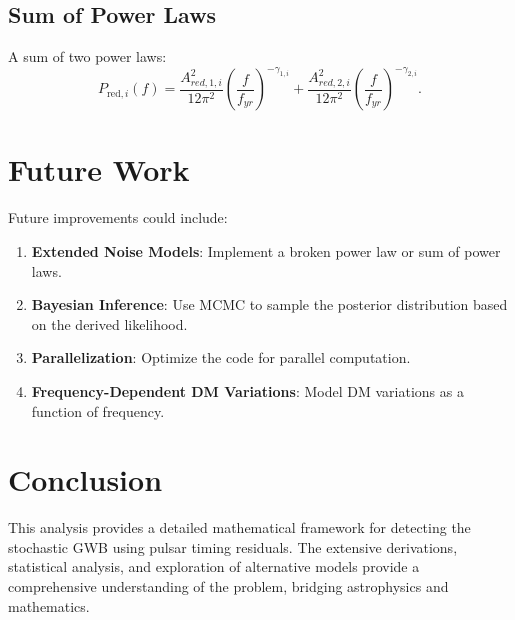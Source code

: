 \documentclass[11pt]{article}
\begin{document}
\subsection{Sum of Power Laws}
A sum of two power laws:
\[
P_{\text{red},i}(f) = \frac{A_{red,1,i}^2}{12 \pi^2} \left( \frac{f}{f_{yr}} \right)^{-\gamma_{1,i}} + \frac{A_{red,2,i}^2}{12 \pi^2} \left( \frac{f}{f_{yr}} \right)^{-\gamma_{2,i}}.
\]

\section{Future Work}
Future improvements could include:
\begin{enumerate}
    \item \textbf{Extended Noise Models}: Implement a broken power law or sum of power laws.
    \item \textbf{Bayesian Inference}: Use MCMC to sample the posterior distribution based on the derived likelihood.
    \item \textbf{Parallelization}: Optimize the code for parallel computation.
    \item \textbf{Frequency-Dependent DM Variations}: Model DM variations as a function of frequency.
\end{enumerate}

\section{Conclusion}
This analysis provides a detailed mathematical framework for detecting the stochastic GWB using pulsar timing residuals. The extensive derivations, statistical analysis, and exploration of alternative models provide a comprehensive understanding of the problem, bridging astrophysics and mathematics.



\end{document}
